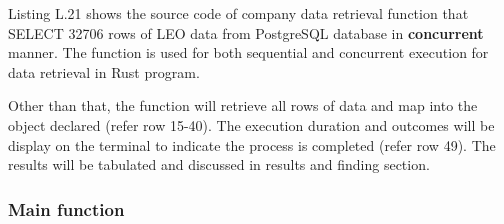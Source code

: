 Listing L.21 shows the source code of company data retrieval function that SELECT 32706 rows of LEO data from PostgreSQL database in \textbf{concurrent} manner. The function is used for both sequential and concurrent execution for data retrieval in Rust program. 

Other than that, the function will retrieve all rows of data and map into the object declared (refer row 15-40). The execution duration and outcomes will be display on the terminal to indicate the process is completed (refer row 49). The results will be tabulated and discussed in results and finding section. 

\newpage

\subsubsection{Main function}


